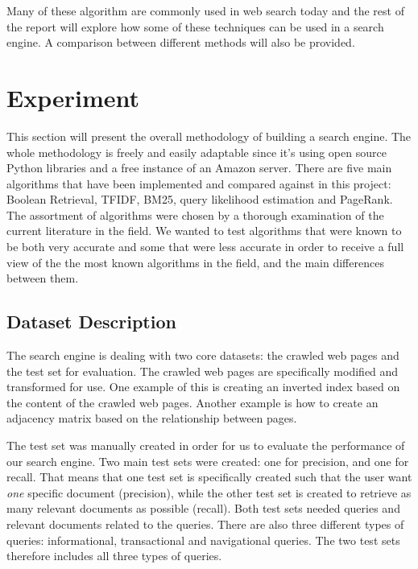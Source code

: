 Many of these algorithm are commonly used in web search today and the rest of the report will explore how some of these techniques can be used in a search engine. A comparison between different methods will also be provided.




\section{Experiment} %
\label{sec:experiment}

This section will present the overall methodology of building a search engine. The whole methodology is freely and easily adaptable since it's using open source Python libraries and a free instance of an Amazon server. There are five main algorithms that have been implemented and compared against in this project: Boolean Retrieval, TFIDF, BM25, query likelihood estimation and PageRank. The assortment of algorithms were chosen by a thorough examination of the current literature in the field. We wanted to test algorithms that were known to be both very accurate and some that were less accurate in order to receive a full view of the the most known algorithms in the field, and the main differences between them. 

\subsection{Dataset Description} %
\label{sub:dataset_description}

The search engine is dealing with two core datasets: the crawled web pages and the test set for evaluation. The crawled web pages are specifically modified and transformed for use. One example of this is creating an inverted index based on the content of the crawled web pages. Another example is how to create an adjacency matrix based on the relationship between pages.

The test set was manually created in order for us to evaluate the performance of our search engine. Two main test sets were created: one for precision, and one for recall. That means that one test set is specifically created such that the user want \emph{one} specific document (precision), while the other test set is created to retrieve as many relevant documents as possible (recall). Both test sets needed queries and relevant documents related to the queries. There are also three different types of queries: informational, transactional and navigational queries. The two test sets therefore includes all three types of queries.

